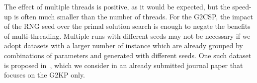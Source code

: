 \documentclass[9pt]{entcs}
\begin{document}
The effect of multiple threads is positive, as it would be expected, but the speed-up is often much smaller than the number of threads.
For the G2CSP, the impact of the RNG seed over the primal solution search is enough to negate the benefits of multi-threading.
Multiple runs with different seeds may not be necessary if we adopt datasets with a larger number of instance which are already grouped by combinations of parameters and generated with different seeds.
One such dataset is proposed in~\cite{velasco:2019}, which we consider in an already submitted journal paper that focuses on the G2KP only.




\end{document}
